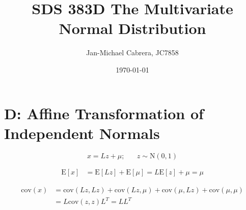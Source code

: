 \documentclass[12pt]{article}
\newcommand{\cov}{\text{cov}}
\newcommand{\E}{\text{E}}
\begin{document}
    \title{SDS 383D The Multivariate Normal Distribution}
    \author{Jan-Michael Cabrera, JC7858}
    \date{\today}
    \maketitle

    \section*{D: Affine Transformation of Independent Normals}

        \begin{equation}
            x = L z + \mu; \hspace{20pt} z \sim \text{N}(0,1)
        \end{equation}

        \begin{align}
            \E [x] &= \E[Lz] + \E[\mu] = L \E[z] + \mu = \mu
        \end{align}

        \begin{align}
            \cov(x) &= \cov(Lz, Lz) + \cov(Lz, \mu) + \cov(\mu, Lz) + \cov(\mu, \mu) \\
            & = L \cov(z, z) L^T = L L^T
        \end{align}
\end{document}
